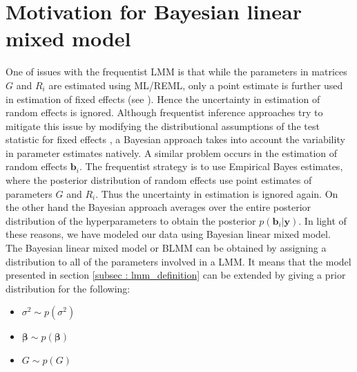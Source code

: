 \section{Motivation for Bayesian linear mixed model}
\label{sec : blmm}
One of issues with the frequentist LMM is that while the parameters in matrices $G$ and $R_i$ are estimated using ML/REML, only a point estimate is further used in estimation of fixed effects (see \cite[chap. 5]{verbeke_linear_2009}). Hence the uncertainty in estimation of random effects is ignored. Although frequentist inference approaches try to mitigate this issue by modifying the distributional assumptions of the test statistic for fixed effects \citep[pg. 56]{verbeke_linear_2009}, a Bayesian approach takes into account the variability in parameter estimates natively. A similar problem occurs in the estimation of random effects $\boldsymbol{b}_i$. The frequentist strategy is to use Empirical Bayes estimates, where the posterior distribution of random effects use point estimates of parameters $G$ and $R_i$. Thus the uncertainty in estimation is ignored again. On the other hand the Bayesian approach averages over the entire posterior distribution of the hyperparameters to obtain the posterior $p(\boldsymbol{b}_i|\boldsymbol{y})$. In light of these reasons, we have modeled our data using Bayesian linear mixed model.\\

The Bayesian linear mixed model or BLMM can be obtained by assigning a distribution to all of the parameters involved in a LMM. It means that the model presented in section \ref{subsec : lmm_definition} can be extended by giving a prior distribution for the following:
\begin{itemize}
\item $\sigma^2 \sim p(\sigma^2)$
\item $\boldsymbol{\beta} \sim p(\boldsymbol{\beta})$
\item $G \sim p(G)$
\end{itemize}

